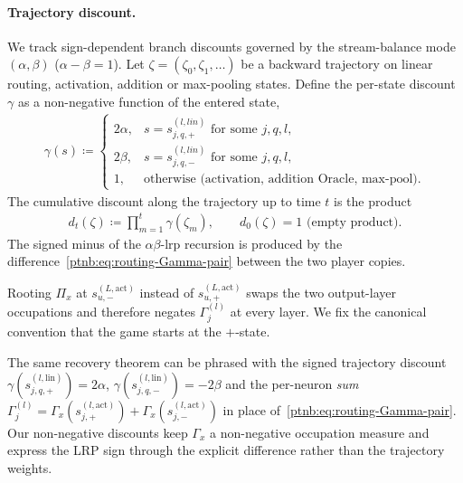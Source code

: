 \paragraph{Trajectory discount.}
We track sign-dependent branch discounts governed by the stream-balance mode $(\alpha, \beta)$
($\alpha-\beta=1$). Let $\zeta = (\zeta_0,\zeta_1,\dots)$ be a backward trajectory on linear
routing, activation, addition or max-pooling states. Define the per-state discount $\gamma$ as a
non-negative function of the entered state,
\begin{align}\label{ptnb:eq:routing-edge-discount}
    \gamma(s) \coloneqq
    \begin{cases}
        2\alpha, & s = s_{j,q,+}^{(l, lin)} \text{ for some } j,q,l,\\
        2\beta, & s = s_{j,q,-}^{(l, lin)} \text{ for some } j,q,l,\\
        1, & \text{otherwise (activation, addition Oracle, max-pool).}
    \end{cases}
\end{align}
The cumulative discount along the trajectory up to time $t$ is the product
\begin{align}\label{ptnb:eq:routing-discount}
    d_t(\zeta) \coloneqq \prod_{m=1}^{t} \gamma(\zeta_m),
    \qquad d_0(\zeta) = 1 \text{ (empty product).}
\end{align}
The signed minus of the $\alpha\beta$-\ac{lrp} recursion is produced by the
difference~\eqref{ptnb:eq:routing-Gamma-pair} between the two player copies.

\begin{remark}\label{ptnb:rem:starting-player}
Rooting $\Pi_x$ at $s_{u,-}^{(L,\mathrm{act})}$ instead of $s_{u,+}^{(L,\mathrm{act})}$ swaps the
two output-layer occupations and therefore negates $\Gamma^{(l)}_j$ at every layer. We fix the
canonical convention that the game starts at the $+$-state.
\end{remark}

\begin{remark}\label{ptnb:rem:signed-discount-alt}
The same recovery theorem can be phrased with the signed trajectory discount
$\gamma(s_{j,q,+}^{(l,\mathrm{lin})}) = 2\alpha$, $\gamma(s_{j,q,-}^{(l,\mathrm{lin})}) = -2\beta$
and the per-neuron \emph{sum} $\Gamma^{(l)}_j = \Gamma_x(s_{j,+}^{(l,\mathrm{act})}) +
    \Gamma_x(s_{j,-}^{(l,\mathrm{act})})$ in place of~\eqref{ptnb:eq:routing-Gamma-pair}. Our non-negative discounts keep $\Gamma_x$ a non-negative occupation measure and express the
LRP sign through the explicit difference rather than the trajectory weights.
\end{remark}

